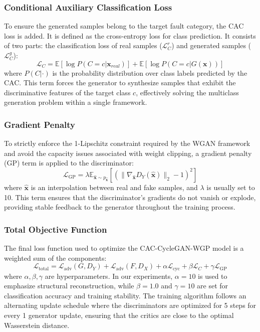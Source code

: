 \subsubsection{Conditional Auxiliary Classification Loss}
To ensure the generated samples belong to the target fault category, the CAC loss is added. It is defined as the cross-entropy loss for class prediction. It consists of two parts: the classification loss of real samples ($\mathcal{L}_{C}^{r}$) and generated samples ($\mathcal{L}_{C}^{g}$):
\begin{equation}
\mathcal{L}_{C} = \mathbb{E}[\log P(C=c | \boldsymbol{x}_{real})] + \mathbb{E}[\log P(C=c | G(\boldsymbol{x}))]
\end{equation}
where $P(C| \cdot)$ is the probability distribution over class labels predicted by the CAC. This term forces the generator to synthesize samples that exhibit the discriminative features of the target class $c$, effectively solving the multiclass generation problem within a single framework.

\subsubsection{Gradient Penalty}
To strictly enforce the 1-Lipschitz constraint required by the WGAN framework and avoid the capacity issues associated with weight clipping, a gradient penalty (GP) term is applied to the discriminator:
\begin{equation}
\mathcal{L}_{\text{GP}} = \lambda \mathbb{E}_{\hat{\boldsymbol{x}} \sim p_{\hat{\boldsymbol{x}}}} [(\|\nabla_{\hat{\boldsymbol{x}}} D_Y(\hat{\boldsymbol{x}})\|_2 - 1)^2]
\end{equation}
where $\hat{\boldsymbol{x}}$ is an interpolation between real and fake samples, and $\lambda$ is usually set to 10. This term ensures that the discriminator's gradients do not vanish or explode, providing stable feedback to the generator throughout the training process.

\subsubsection{Total Objective Function}
The final loss function used to optimize the CAC-CycleGAN-WGP model is a weighted sum of the components:
\begin{equation}
\mathcal{L}_{\text{total}} = \mathcal{L}_{\text{adv}}(G, D_Y) + \mathcal{L}_{\text{adv}}(F, D_X) + \alpha \mathcal{L}_{\text{cyc}} + \beta \mathcal{L}_{C} + \gamma \mathcal{L}_{\text{GP}}
\end{equation}
where $\alpha, \beta, \gamma$ are hyperparameters. In our experiments, $\alpha=10$ is used to emphasize structural reconstruction, while $\beta=1.0$ and $\gamma=10$ are set for classification accuracy and training stability. The training algorithm follows an alternating update schedule where the discriminators are optimized for 5 steps for every 1 generator update, ensuring that the critics are close to the optimal Wasserstein distance.


